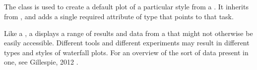 \begin{blockChanged}
\subsection{}
\label{class:waterfallPlot}
The \WaterfallPlot class is used to create a default plot of a particular style from a \ParameterEstimationTask.  It inherits from \Plot, and adds a single required attribute  of type \SIdRef that points to that task.

Like a \ParameterEstimationResultsPlot, a \WaterfallPlot displays a range of results and data from a \ParameterEstimationTask that might not otherwise be easily accessible.  Different tools and different experiments may result in different types and styles of waterfall plots.  For an overview of the sort of data present in one, see Gillespie, 2012 \citep{gillespie2012}.


\end{blockChanged}
